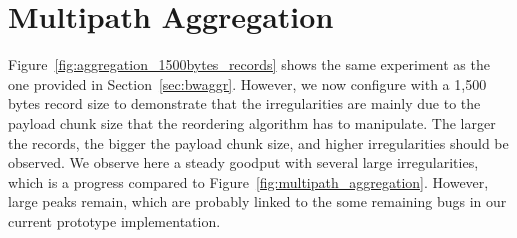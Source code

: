 %

\section{Multipath Aggregation}
\label{appendix:aggr}

Figure~\ref{fig:aggregation_1500bytes_records} shows the same experiment as
the one provided in Section~\ref{sec:bwaggr}. However, we now configure
\tcpls with a 1,500 bytes record size to demonstrate that the
irregularities are mainly due to the payload chunk size that the reordering
algorithm has to manipulate. The larger the records, the bigger
the payload chunk size, and higher irregularities should be observed. We
observe here a steady goodput with several large irregularities, which is a
progress compared to Figure~\ref{fig:multipath_aggregation}. However, large
peaks remain, which are probably linked to the some remaining bugs in our current \tcpls
prototype implementation.

